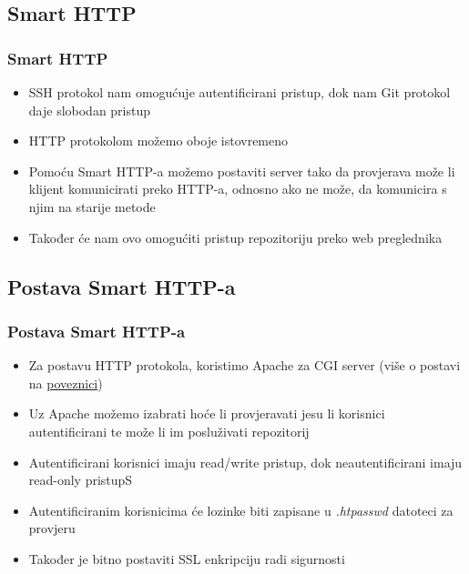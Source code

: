 \subsection{Smart HTTP}

\begin{frame}
\frametitle{Smart HTTP}
\begin{itemize}
	\item SSH protokol nam omogućuje autentificirani pristup, dok nam Git protokol daje slobodan pristup
	\item HTTP protokolom možemo oboje istovremeno
	\item Pomoću Smart HTTP-a možemo postaviti server tako da provjerava može li klijent komunicirati preko HTTP-a, odnosno ako ne može, da komunicira s njim na starije metode
	\item Također će nam ovo omogućiti pristup repozitoriju preko web preglednika
\end{itemize}
\end{frame}


\subsection{Postava Smart HTTP-a}

\begin{frame}
\frametitle{Postava Smart HTTP-a}
\begin{itemize}
	\item Za postavu HTTP protokola, koristimo Apache za CGI server (više o postavi na \href{https://git-scm.com/book/en/v2/Git-on-the-Server-Smart-HTTP}{poveznici})
	\item Uz Apache možemo izabrati hoće li provjeravati jesu li korisnici autentificirani te može li im posluživati repozitorij
	\item Autentificirani korisnici imaju read/write pristup, dok neautentificirani imaju read-only pristupS
	\item Autentificiranim korisnicima će lozinke biti zapisane u \textit{.htpasswd} datoteci za provjeru
	\item Također je bitno postaviti SSL enkripciju radi sigurnosti
\end{itemize}
\end{frame}

